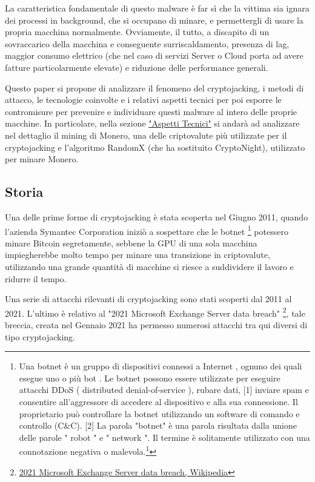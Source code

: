 \documentclass[12pt,a4paper]{article}
\begin{document}
La caratteristica fondamentale di questo malware è far sì che la vittima sia
ignara dei processi in background, che si occupano di minare, e permettergli di
usare la propria macchina normalmente. Ovviamente, il tutto, a discapito di un
sovraccarico della macchina e conseguente surriscaldamento, presenza di lag,
maggior consumo elettrico (che nel caso di servizi Server o Cloud porta ad avere
fatture particolarmente elevate) e riduzione delle performance generali.

Questo paper si propone di analizzare il fenomeno del cryptojacking, i metodi di
attacco, le tecnologie coinvolte e i relativi aspetti tecnici per poi esporre le
contromisure per prevenire e individuare questi malware al intero delle proprie
macchine. In particolare, nella sezione \hyperref[sec:aspetti_tecnici]{"Aspetti
Tecnici"} si andarà ad analizzare nel dettaglio il mining di Monero, una delle
criptovalute più utilizzate per il cryptojacking e l'algoritmo RandomX (che ha
sostituito CryptoNight), utilizzato per minare Monero.

\subsection{Storia}

Una delle prime forme di cryptojacking è stata scoperta nel Giugno 2011, quando
l'azienda Symantec Corporation iniziò a sospettare che le botnet \footnote{ Una
botnet è un gruppo di dispositivi connessi a Internet , ognuno dei quali esegue
uno o più bot . Le botnet possono essere utilizzate per eseguire attacchi DDoS (
distributed denial-of-service ), rubare dati, [1] inviare spam e consentire
all'aggressore di accedere al dispositivo e alla sua connessione. Il
proprietario può controllare la botnet utilizzando un software di comando e
controllo (C\&C). [2] La parola "botnet" è una parola risultata dalla unione
delle parole " robot " e " network ". Il termine è solitamente utilizzato con
una connotazione negativa o
malevola.\footnote{\href{https://arc.net/l/quote/ftyxgxms}{Botnet, Wikipedia}}}
potessero minare Bitcoin segretamente, sebbene la GPU di una sola macchina
impiegherebbe molto tempo per minare una transizione in criptovalute,
utilizzando una grande quantità di macchine si riesce a suddividere il lavoro e
ridurre il tempo.

Una serie di attacchi rilevanti di cryptojacking sono stati scoperti dal 2011 al
2021. L'ultimo è relativo al "2021 Microsoft Exchange Server data breach"
\footnote{\href{https://arc.net/l/quote/golshtco}{2021 Microsoft Exchange Server
data breach, Wikipedia}}, tale breccia, creata nel Gennaio 2021 ha permesso
numerosi attacchi tra qui diversi di tipo cryptojacking.
\end{document}
